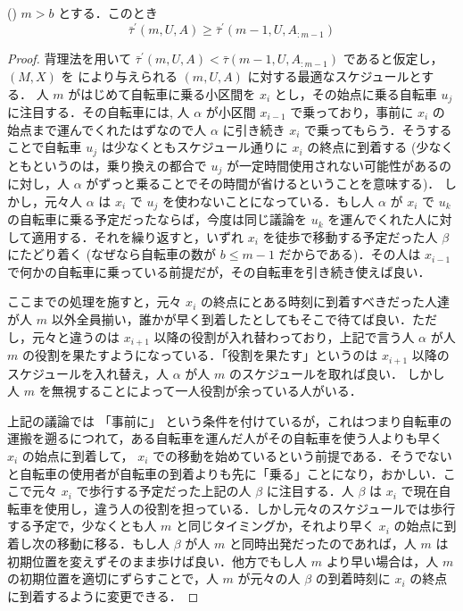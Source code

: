 \begin{lemma}\label{lemma:fsabs-lower-bound-recursive}
  ({\color{red}{補題 or 定理？}}) $m > b$ とする．このとき
  \begin{equation}
    \bar\tau^{\prime}(m, U, A) \geq \bar\tau^\prime(m - 1, U, A_{:m-1})
  \end{equation}
\end{lemma}
\begin{proof}
  背理法を用いて $\bar\tau^{\prime}(m, U, A) < \bar\tau(m - 1, U, A_{:m-1})$ であると仮定し，$(M, X)$ を により与えられる $(m, U, A)$ に対する最適なスケジュールとする．
  人 $m$ がはじめて自転車に乗る小区間を $x_i$ とし，その始点に乗る自転車 $u_j$ に注目する．その自転車には,
  人 $\alpha$ が小区間 $x_{i - 1}$ で乗っており，事前に $x_i$ の始点まで運んでくれたはずなので人 $\alpha$ に引き続き $x_i$ で乗ってもらう．そうすることで自転車 $u_j$ は少なくともスケジュール通りに $x_i$ の終点に到着する (少なくともというのは，乗り換えの都合で $u_j$ が一定時間使用されない可能性があるのに対し，人 $\alpha$ がずっと乗ることでその時間が省けるということを意味する)． しかし，元々人 $\alpha$ は $x_i$ で $u_j$ を使わないことになっている．もし人 $\alpha$ が $x_i$ で $u_k$ の自転車に乗る予定だったならば，今度は同じ議論を $u_k$ を運んでくれた人に対して適用する．それを繰り返すと，いずれ $x_i$ を徒歩で移動する予定だった人 $\beta$ にたどり着く (なぜなら自転車の数が $b \leq m - 1$ だからである)．その人は $x_{i - 1}$ で何かの自転車に乗っている前提だが，その自転車を引き続き使えば良い．

ここまでの処理を施すと，元々 $x_i$ の終点にとある時刻に到着すべきだった人達が人 $m$ 以外全員揃い，誰かが早く到着したとしてもそこで待てば良い．ただし，元々と違うのは $x_{i + 1}$ 以降の役割が入れ替わっており，上記で言う人 $\alpha$ が人 $m$ の役割を果たすようになっている．「役割を果たす」というのは $x_{i + 1}$ 以降のスケジュールを入れ替え，人 $\alpha$ が人 $m$ のスケジュールを取れば良い． しかし人 $m$ を無視することによって一人役割が余っている人がいる．

上記の議論では 「事前に」 という条件を付けているが，これはつまり自転車の運搬を遡るにつれて，ある自転車を運んだ人がその自転車を使う人よりも早く $x_i$ の始点に到着して， $x_i$ での移動を始めているという前提である．そうでないと自転車の使用者が自転車の到着よりも先に「乗る」ことになり，おかしい．ここで元々 $x_i$ で歩行する予定だった上記の人 $\beta$ に注目する．人 $\beta$ は $x_i$ で現在自転車を使用し，違う人の役割を担っている．しかし元々のスケジュールでは歩行する予定で，少なくとも人 $m$ と同じタイミングか，それより早く $x_i$ の始点に到着し次の移動に移る．もし人 $\beta$ が人 $m$ と同時出発だったのであれば，人 $m$ は初期位置を変えずそのまま歩けば良い．他方でもし人 $m$ より早い場合は，人 $m$ の初期位置を適切にずらすことで，人 $m$ が元々の人 $\beta$ の到着時刻に $x_i$ の終点に到着するように変更できる．


\end{proof}
